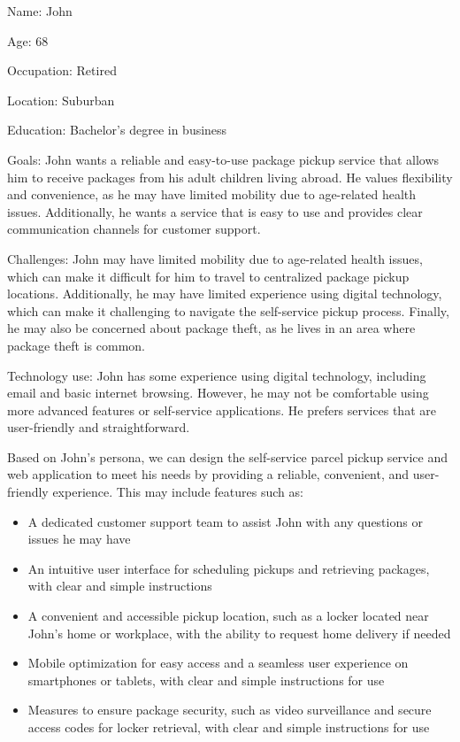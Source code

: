\documentclass{article}
\begin{document}
Name: John

Age: 68

Occupation: Retired

Location: Suburban

Education: Bachelor's degree in business

Goals: John wants a reliable and easy-to-use package pickup service that allows him to receive packages from his adult children living abroad. He values flexibility and convenience, as he may have limited mobility due to age-related health issues. Additionally, he wants a service that is easy to use and provides clear communication channels for customer support.

Challenges: John may have limited mobility due to age-related health issues, which can make it difficult for him to travel to centralized package pickup locations. Additionally, he may have limited experience using digital technology, which can make it challenging to navigate the self-service pickup process. Finally, he may also be concerned about package theft, as he lives in an area where package theft is common.

Technology use: John has some experience using digital technology, including email and basic internet browsing. However, he may not be comfortable using more advanced features or self-service applications. He prefers services that are user-friendly and straightforward.

Based on John's persona, we can design the self-service parcel pickup service and web application to meet his needs by providing a reliable, convenient, and user-friendly experience. This may include features such as:
\begin{itemize}
    \item A dedicated customer support team to assist John with any questions or issues he may have
    \item An intuitive user interface for scheduling pickups and retrieving packages, with clear and simple instructions
    \item A convenient and accessible pickup location, such as a locker located near John's home or workplace, with the ability to request home delivery if needed
    \item Mobile optimization for easy access and a seamless user experience on smartphones or tablets, with clear and simple instructions for use
    \item Measures to ensure package security, such as video surveillance and secure access codes for locker retrieval, with clear and simple instructions for use
\end{itemize}
\end{document}
